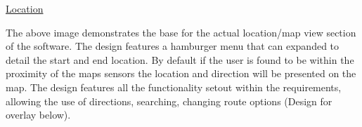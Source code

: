 \underline{Location}
\begin{center}
\end{center}
 The above image demonstrates the base for the actual location/map view section of the software. The design features a hamburger menu that can expanded to detail the start and end location. By default if the user is found to be within the proximity of the maps sensors the location and direction will be presented on the map. The design features all the functionality setout within the requirements, allowing the use of directions, searching, changing route options (Design for overlay below). 

